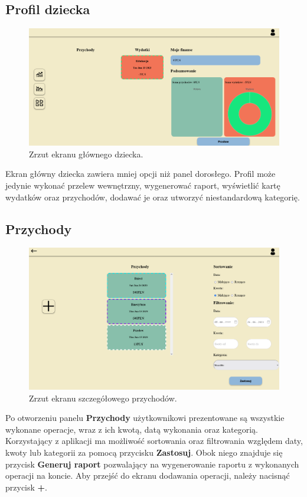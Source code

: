 \documentclass[12pt,a4paper,oneside]{article}
\begin{document}
\subsection{Profil dziecka}
\begin{figure}[H]
    \centering
    \includegraphics[width=\hsize,keepaspectratio]{images/childs_profile.png}
    \caption{Zrzut ekranu głównego dziecka.}
\end{figure}
Ekran główny dziecka zawiera mniej opcji niż panel dorosłego. Profil może
jedynie wykonać przelew wewnętrzny, wygenerować raport, wyświetlić kartę
wydatków oraz przychodów, dodawać je oraz utworzyć niestandardową kategorię.

\subsection{Przychody}
\begin{figure}[H]
    \centering
    \includegraphics[width=\hsize,keepaspectratio]{images/incomes_card.png}
    \caption{Zrzut ekranu szczegółowego przychodów.}
\end{figure}
Po otworzeniu panelu \textbf{Przychody} użytkownikowi prezentowane są wszystkie
wykonane operacje, wraz z ich kwotą, datą wykonania oraz kategorią. Korzystający
z aplikacji ma możliwość sortowania oraz filtrowania względem daty, kwoty lub
kategorii za pomocą przycisku \textbf{Zastosuj}. Obok niego znajduje się 
przycisk \textbf{Generuj raport} pozwalający na wygenerowanie raportu z 
wykonanych operacji na koncie. Aby przejść do ekranu dodawania operacji, należy 
nacisnąć przycisk \textbf{+}.
\end{document}
